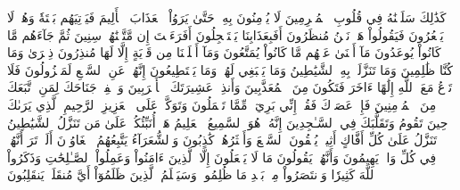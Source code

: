 كَذَٰلِكَ سَلَكۡنَٰهُ فِي قُلُوبِ ٱلۡمُجۡرِمِينَ
لَا يُؤۡمِنُونَ بِهِۦ حَتَّىٰ يَرَوُاْ ٱلۡعَذَابَ ٱلۡأَلِيمَ
فَيَأۡتِيَهُم بَغۡتَةٗ وَهُمۡ لَا يَشۡعُرُونَ
فَيَقُولُواْ هَلۡ نَحۡنُ مُنظَرُونَ
أَفَبِعَذَابِنَا يَسۡتَعۡجِلُونَ
أَفَرَءَيۡتَ إِن مَّتَّعۡنَٰهُمۡ سِنِينَ
ثُمَّ جَآءَهُم مَّا كَانُواْ يُوعَدُونَ
مَآ أَغۡنَىٰ عَنۡهُم مَّا كَانُواْ يُمَتَّعُونَ
وَمَآ أَهۡلَكۡنَا مِن قَرۡيَةٍ إِلَّا لَهَا مُنذِرُونَ
ذِكۡرَىٰ وَمَا كُنَّا ظَٰلِمِينَ
وَمَا تَنَزَّلَتۡ بِهِ ٱلشَّيَٰطِينُ
وَمَا يَنۢبَغِي لَهُمۡ وَمَا يَسۡتَطِيعُونَ
إِنَّهُمۡ عَنِ ٱلسَّمۡعِ لَمَعۡزُولُونَ
فَلَا تَدۡعُ مَعَ ٱللَّهِ إِلَٰهًا ءَاخَرَ فَتَكُونَ مِنَ ٱلۡمُعَذَّبِينَ
وَأَنذِرۡ عَشِيرَتَكَ ٱلۡأَقۡرَبِينَ
وَٱخۡفِضۡ جَنَاحَكَ لِمَنِ ٱتَّبَعَكَ مِنَ ٱلۡمُؤۡمِنِينَ
فَإِنۡ عَصَوۡكَ فَقُلۡ إِنِّي بَرِيٓءٞ مِّمَّا تَعۡمَلُونَ
وَتَوَكَّلۡ عَلَى ٱلۡعَزِيزِ ٱلرَّحِيمِ
ٱلَّذِي يَرَىٰكَ حِينَ تَقُومُ
وَتَقَلُّبَكَ فِي ٱلسَّـٰجِدِينَ
إِنَّهُۥ هُوَ ٱلسَّمِيعُ ٱلۡعَلِيمُ
هَلۡ أُنَبِّئُكُمۡ عَلَىٰ مَن تَنَزَّلُ ٱلشَّيَٰطِينُ
تَنَزَّلُ عَلَىٰ كُلِّ أَفَّاكٍ أَثِيمٖ
يُلۡقُونَ ٱلسَّمۡعَ وَأَكۡثَرُهُمۡ كَٰذِبُونَ
وَٱلشُّعَرَآءُ يَتَّبِعُهُمُ ٱلۡغَاوُۥنَ
أَلَمۡ تَرَ أَنَّهُمۡ فِي كُلِّ وَادٖ يَهِيمُونَ
وَأَنَّهُمۡ يَقُولُونَ مَا لَا يَفۡعَلُونَ
إِلَّا ٱلَّذِينَ ءَامَنُواْ وَعَمِلُواْ ٱلصَّـٰلِحَٰتِ وَذَكَرُواْ ٱللَّهَ كَثِيرٗا وَٱنتَصَرُواْ مِنۢ بَعۡدِ مَا ظُلِمُواْۗ وَسَيَعۡلَمُ ٱلَّذِينَ ظَلَمُوٓاْ أَيَّ مُنقَلَبٖ يَنقَلِبُونَ